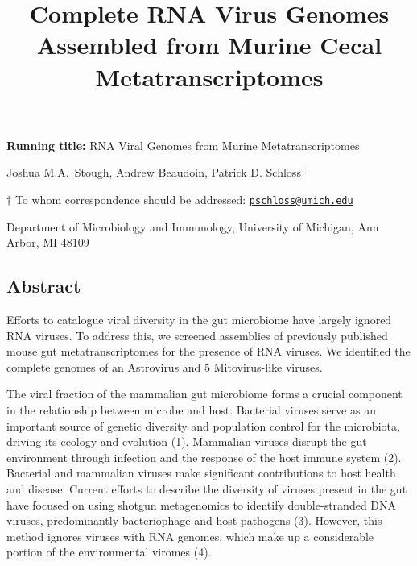 \documentclass[
  11pt,
]{article}
\title{\textbf{Complete RNA Virus Genomes Assembled from Murine Cecal
Metatranscriptomes}}
\author{}
\date{\vspace{-2.5em}}
\begin{document}
\maketitle

\vspace{35mm}

\textbf{Running title:} RNA Viral Genomes from Murine Metatranscriptomes

\vspace{35mm}

Joshua M.A.~Stough, Andrew Beaudoin, Patrick D.
Schloss\textsuperscript{\(\dagger\)}

\vspace{40mm}

\(\dagger\) To whom correspondence should be addressed:
\href{mailto:pschloss@umich.edu}{\nolinkurl{pschloss@umich.edu}}

Department of Microbiology and Immunology, University of Michigan, Ann
Arbor, MI 48109

\newpage
\linenumbers

\hypertarget{abstract}{%
\subsection{Abstract}\label{abstract}}

Efforts to catalogue viral diversity in the gut microbiome have largely
ignored RNA viruses. To address this, we screened assemblies of
previously published mouse gut metatranscriptomes for the presence of
RNA viruses. We identified the complete genomes of an Astrovirus and 5
Mitovirus-like viruses.

\newpage

The viral fraction of the mammalian gut microbiome forms a crucial
component in the relationship between microbe and host. Bacterial
viruses serve as an important source of genetic diversity and population
control for the microbiota, driving its ecology and evolution (1).
Mammalian viruses disrupt the gut environment through infection and the
response of the host immune system (2). Bacterial and mammalian viruses
make significant contributions to host health and disease. Current
efforts to describe the diversity of viruses present in the gut have
focused on using shotgun metagenomics to identify double-stranded DNA
viruses, predominantly bacteriophage and host pathogens (3). However,
this method ignores viruses with RNA genomes, which make up a
considerable portion of the environmental viromes (4).
\end{document}
